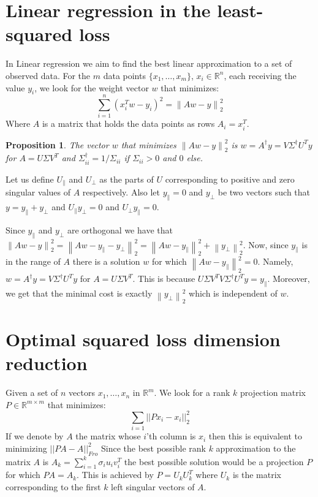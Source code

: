 \documentclass{article}
\newcommand{\R}{\mathbb R}
\newcommand{\norm}[1]{\left \lVert #1 \right \rVert}
\newtheorem{proposition}[theorem]{Proposition}
\begin{document}
\section{Linear regression in the least-squared loss}
In Linear regression we aim to find the best linear approximation 
to a set of observed data. For the $m$ data  points $\{x_1,\ldots,x_m\}$,  $x_i \in \R^n$,
each receiving the value $y_i$, we look for the weight vector $w$ that minimizes:
\[
\sum_{i=1}^{n} (x_{i}^{T}w - y_i)^2 = \norm{Aw - y}_{2}^{2}
\]
Where $A$ is a matrix that holds the data points as rows $A_i = x^{T}_{i}$.

\begin{proposition}
The vector $w$ that minimizes $\norm{Aw - y}_{2}^{2}$ is $w = A^{\dagger}y = V\Sigma^{\dagger}U^{T}y$
for $A = U\Sigma V^T$ and $\Sigma^{\dagger}_{ii} = 1/\Sigma_{ii}$ if $\Sigma_{ii} > 0$ and $0$ else. 
\end{proposition}

Let us define $U_{\parallel}$ and $U_{\perp}$ as the parts of $U$ corresponding to positive and zero singular values of $A$ respectively. 
Also let $y_{\parallel} = 0$ and $y_{\perp}$ be two vectors such that $y = y_{\parallel}+y_{\perp}$ and 
$U_{\parallel}y_{\perp} = 0$ and $U_{\perp}y_{\parallel}=0$.

Since $y_{\parallel}$ and $y_{\perp}$ are orthogonal we have that  $\norm{Aw - y}_{2}^{2}
= \norm{Aw - y_{\parallel}-y_{\perp}}_{2}^{2} = \norm{Aw - y_{\parallel}}_{2}^{2} + \norm{y_{\perp}}_{2}^{2}$.
Now, since $y_{\parallel}$ is in the range of $A$ there is a solution $w$ for which $\norm{Aw - y_{\parallel}}_{2}^{2} = 0$.
Namely, $w = A^{\dagger}y = V\Sigma^{\dagger}U^{T}y$ for $A = U\Sigma V^{T}$. This is because $U\Sigma V^{T}V\Sigma^{\dagger}U^{T}y = y_{\parallel}$.
Moreover, we get that the minimal cost is exactly $ \norm{y_{\perp}}_{2}^{2}$ which is independent of $w$.


\section{Optimal squared loss dimension reduction}

Given a set of $n$ vectors $x_1,\ldots,x_n$ in $\R^{m}$. We look for a rank $k$ 
projection matrix $P \in \R^{m \times m}$ that minimizes:
\[
\sum_{i=1} ||Px_{i} - x_{i}||_{2}^{2}
\]
If we denote by $A$ the matrix whose $i$'th column is $x_i$ then this is equivalent to minimizing $||PA - A||_{Fro}^{2}$
Since the best possible rank $k$ approximation to the matrix $A$ is $A_{k} = \sum_{i=1}^{k}\sigma_{i}u_{i}v_{i}^{T}$ the best
possible solution would be a projection $P$ for which $PA = A_{k}$. This is achieved by $P = U_{k}U_{k}^{T}$ where $U_{k}$
is the matrix corresponding to the first $k$ left singular vectors of $A$. 
\end{document}
